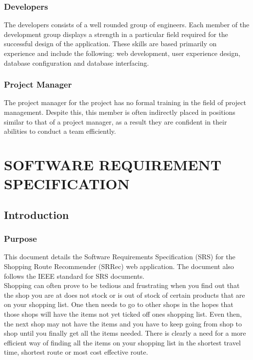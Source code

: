 \documentclass[10pt,twocolumn]{witseiepaper}
\begin{document}
		\subsubsection{Developers} The developers consists of a well rounded group of engineers. Each member of the development group displays a strength in a particular field required for the successful design of the application. These skills are based primarily on experience and include the following: web development, user experience design, database configuration and database interfacing.\\ 
		
		\subsubsection{Project Manager} The project manager for the project has no formal training in the field of project management. Despite this, this member is often indirectly placed in positions similar to that of a project manager, as a result they are confident in their abilities to conduct a team efficiently. \\

\section{SOFTWARE REQUIREMENT SPECIFICATION}
	
	\subsection{Introduction}
		
		\subsubsection{Purpose}
		
			This document details the Software Requirements Specification (SRS) for the Shopping Route Recommender (SRRec) web application. The document also follows the IEEE standard for SRS documents.\\
			
			Shopping can often prove to be tedious and frustrating when you find out that the shop you are at does not stock or is out of stock of certain products that are on your shopping list. One then needs to go to other shops in the hopes that those shops will have the items not yet ticked off ones shopping list. Even then, the next shop may not have the items and you have to keep going from shop to shop until you finally get all the items needed. There is clearly a need for a more efficient way of finding all the items on your shopping list in the shortest travel time, shortest route or most cost effective route.\\
			
\end{document}
